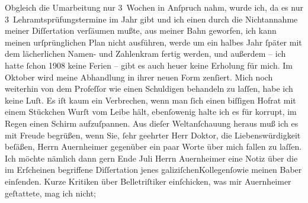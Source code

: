 \pstart
           Obgleich die Umarbeitung nur 3 Wochen in Anſpruch nahm, wurde ich, da es nur
               3 Lehramtsprüfungstermine im Jahr gibt und ich einen durch die Nichtannahme meiner
               Diſſertation verſäumen mußte, aus meiner Bahn geworfen, ich kann meinen
               urſprünglichen Plan nicht ausführen, werde um ein halbes Jahr{ }ſpäter mit dem
               lächerlichen Namen- und Zahlenkram fertig werden, und außerdem – ich hatte{ }ſchon
                  1908 keine Ferien – gibt es auch heuer keine Erholung für mich. Im
                  Oktober wird meine Abhandlung in ihrer neuen Form zenſiert. Mich noch weiterhin von dem Profeſſor wie einen
               Schuldigen behandeln zu laſſen, habe ich keine Luſt. Es iſt kaum ein Verbrechen, wenn
               man{ }ſich einen biſſigen Hofrat mit einem Stückchen Wurſt vom Leibe hält, ebenſowenig
               halte ich es für korrupt, im Regen einen Schirm aufzuſpannen. Aus dieſer
               Weltanſchauung heraus muß ich es mit Freude begrüßen, wenn Sie,{ }ſehr geehrter Herr
               Doktor, die Liebenswürdigkeit beſäßen, Herrn Auernheimer gegenüber ein paar Worte über mich fallen zu laſſen. Ich möchte
               nämlich dann gern Ende Juli Herrn Auernheimer eine Notiz über die im Erſcheinen begriffene Diſſertation jenes galiziſchenKollegenſowie meinen Baber einſenden. Kurze Kritiken über Belletriſtiker einſchicken,
               was mir Auernheimer geſtattete, mag ich nicht;
